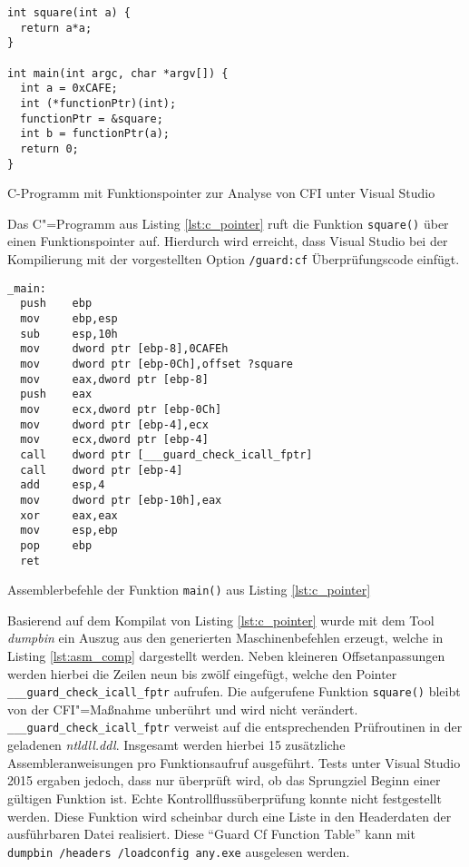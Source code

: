 \documentclass[12pt,%
               oneside,
               a4paper]{uiothesis}
\begin{document}
\begin{listing}
\begin{verbatim}
int square(int a) {
  return a*a;
}

int main(int argc, char *argv[]) {
  int a = 0xCAFE;
  int (*functionPtr)(int);
  functionPtr = &square;
  int b = functionPtr(a);
  return 0;
}
\end{verbatim}
\caption{C-Programm mit Funktionspointer zur Analyse von CFI unter Visual Studio}
\label{lst:c_pointer}
\end{listing}

Das C"=Programm aus Listing \ref{lst:c_pointer} ruft die Funktion \texttt{square()} über einen Funktionspointer auf. Hierdurch wird erreicht, dass Visual Studio bei der Kompilierung mit der vorgestellten Option \texttt{/guard:cf} Überprüfungscode einfügt.

\begin{listing}
\begin{verbatim}
_main:
  push    ebp
  mov     ebp,esp
  sub     esp,10h
  mov     dword ptr [ebp-8],0CAFEh
  mov     dword ptr [ebp-0Ch],offset ?square
  mov     eax,dword ptr [ebp-8]
  push    eax
  mov     ecx,dword ptr [ebp-0Ch]
  mov     dword ptr [ebp-4],ecx
  mov     ecx,dword ptr [ebp-4]
  call    dword ptr [___guard_check_icall_fptr]
  call    dword ptr [ebp-4]
  add     esp,4
  mov     dword ptr [ebp-10h],eax
  xor     eax,eax
  mov     esp,ebp
  pop     ebp
  ret
\end{verbatim}
\caption{Assemblerbefehle der Funktion \texttt{main()} aus Listing \ref{lst:c_pointer}}
\label{lst:asm_comp}
\end{listing}

Basierend auf dem Kompilat von Listing \ref{lst:c_pointer} wurde mit dem Tool \emph{dumpbin} ein Auszug aus den generierten Maschinenbefehlen erzeugt, welche in Listing \ref{lst:asm_comp} dargestellt werden. Neben kleineren Offsetanpassungen werden hierbei die Zeilen neun bis zwölf eingefügt, welche den Pointer \texttt{___guard_check_icall_fptr} aufrufen. Die aufgerufene Funktion \texttt{square()} bleibt von der CFI"=Maßnahme unberührt und wird nicht verändert. \texttt{___guard_check_icall_fptr} verweist auf die entsprechenden Prüfroutinen in der geladenen \emph{ntldll.ddl}. Insgesamt werden hierbei 15 zusätzliche Assembleranweisungen pro Funktionsaufruf ausgeführt. Tests unter Visual Studio 2015 ergaben jedoch, dass nur überprüft wird, ob das Sprungziel Beginn einer gültigen Funktion ist. Echte Kontrollflussüberprüfung konnte nicht festgestellt werden. Diese Funktion wird scheinbar durch eine Liste in den Headerdaten der ausführbaren Datei realisiert. Diese \enquote{Guard Cf Function Table} kann mit \texttt{ dumpbin /headers /loadconfig any.exe} ausgelesen werden.
\end{document}
